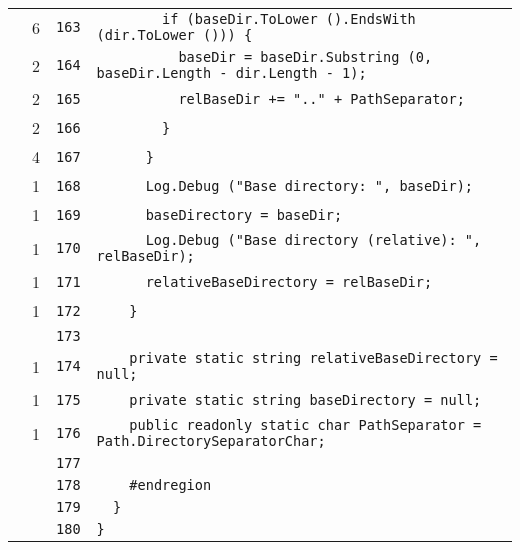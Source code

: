 \documentclass[a4paper,10pt]{article}
\begin{document}
\begin{longtable}[l]{lrrl}
\cellcolor{green} & 6 & \verb~163~ & \verb~        if (baseDir.ToLower ().EndsWith (dir.ToLower ())) {~\\
\cellcolor{green} & 2 & \verb~164~ & \verb~          baseDir = baseDir.Substring (0, baseDir.Length - dir.Length - 1);~\\
\cellcolor{green} & 2 & \verb~165~ & \verb~          relBaseDir += ".." + PathSeparator;~\\
\cellcolor{green} & 2 & \verb~166~ & \verb~        }~\\
\cellcolor{green} & 4 & \verb~167~ & \verb~      }~\\
\cellcolor{green} & 1 & \verb~168~ & \verb~      Log.Debug ("Base directory: ", baseDir);~\\
\cellcolor{green} & 1 & \verb~169~ & \verb~      baseDirectory = baseDir;~\\
\cellcolor{green} & 1 & \verb~170~ & \verb~      Log.Debug ("Base directory (relative): ", relBaseDir);~\\
\cellcolor{green} & 1 & \verb~171~ & \verb~      relativeBaseDirectory = relBaseDir;~\\
\cellcolor{green} & 1 & \verb~172~ & \verb~    }~\\
\cellcolor{gray} &  & \verb~173~ & \verb~~\\
\cellcolor{green} & 1 & \verb~174~ & \verb~    private static string relativeBaseDirectory = null;~\\
\cellcolor{green} & 1 & \verb~175~ & \verb~    private static string baseDirectory = null;~\\
\cellcolor{green} & 1 & \verb~176~ & \verb~    public readonly static char PathSeparator = Path.DirectorySeparatorChar;~\\
\cellcolor{gray} &  & \verb~177~ & \verb~~\\
\cellcolor{gray} &  & \verb~178~ & \verb~    #endregion~\\
\cellcolor{gray} &  & \verb~179~ & \verb~  }~\\
\cellcolor{gray} &  & \verb~180~ & \verb~}~\\
\end{longtable}
\end{document}
